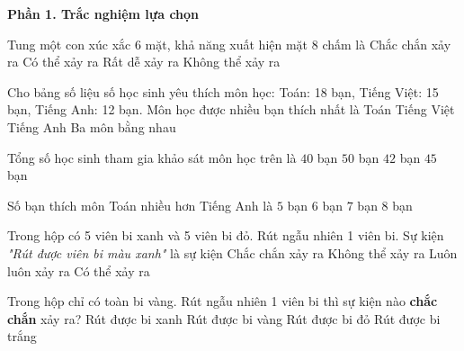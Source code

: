 \textbf{Phần 1. Trắc nghiệm lựa chọn}

\begin{ex} %
Tung một con xúc xắc 6 mặt, khả năng xuất hiện mặt 8 chấm là
\choice
{Chắc chắn xảy ra}
{Có thể xảy ra}
{Rất dễ xảy ra}
{\True Không thể xảy ra}
\end{ex}

\begin{ex} %
Cho bảng số liệu số học sinh yêu thích môn học: Toán: 18 bạn, Tiếng Việt: 15 bạn, Tiếng Anh: 12 bạn. Môn học được nhiều bạn thích nhất là
\choice
{\True Toán}
{Tiếng Việt}
{Tiếng Anh}
{Ba môn bằng nhau}
\end{ex}

\begin{ex} %
Tổng số học sinh tham gia khảo sát môn học trên là
\choice
{$40$ bạn}
{$50$ bạn}
{$42$ bạn}
{\True $45$ bạn}
\end{ex}

\begin{ex} %
Số bạn thích môn Toán nhiều hơn Tiếng Anh là
\choice
{$5$ bạn}
{\True $6$ bạn}
{$7$ bạn}
{$8$ bạn}
\end{ex}

\begin{ex} %
Trong hộp có 5 viên bi xanh và 5 viên bi đỏ. Rút ngẫu nhiên 1 viên bi. Sự kiện \textit{"Rút được viên bi màu xanh"} là sự kiện
\choice
{Chắc chắn xảy ra}
{Không thể xảy ra}
{Luôn luôn xảy ra}
{\True Có thể xảy ra}
\end{ex}

\begin{ex} %
Trong hộp chỉ có toàn bi vàng. Rút ngẫu nhiên 1 viên bi thì sự kiện nào \textbf{chắc chắn} xảy ra?
\choice
{Rút được bi xanh}
{\True Rút được bi vàng}
{Rút được bi đỏ}
{Rút được bi trắng}
\end{ex}

